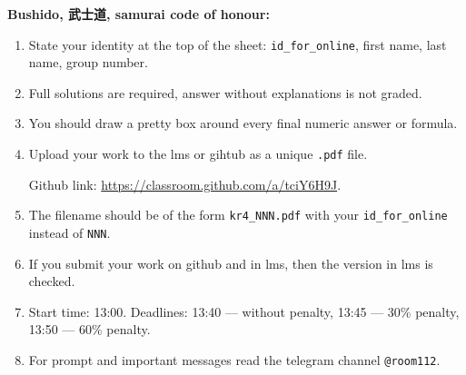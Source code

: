 \documentclass[12pt]{article}
\begin{document}
\textbf{Bushido, 武士道, samurai code of honour:}

\vspace{5mm}

\begin{enumerate}
\item State your identity at the top of the sheet: \verb|id_for_online|, first name, last name, group number.
\item Full solutions are required, answer without explanations is not graded. 
\item You should draw a pretty box around every final numeric answer or formula.
\item Upload your work to the lms or gihtub as a unique \verb|.pdf| file.

Github link: \url{https://classroom.github.com/a/tciY6H9J}.
\item The filename should be of the form \verb|kr4_NNN.pdf| with your \verb|id_for_online| instead of \verb|NNN|.
\item If you submit your work on github and in lms, then the version in lms is checked.
\item Start time: 13:00. Deadlines: 13:40 — without penalty, 13:45 — 30\% penalty, 13:50 — 60\% penalty.
\item For prompt and important messages read the telegram channel \verb|@room112|.
\end{enumerate}
\end{document}
